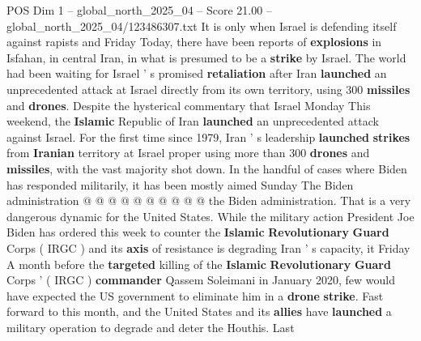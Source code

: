 \begin{textsample}{POS Dim 1 – global\_north\_2025\_04 – Score 21.00 – global\_north\_2025\_04/123486307.txt}
It is only when Israel is defending itself against rapists and Friday Today, there have been reports of \textbf{explosions} in Isfahan, in central Iran, in what is presumed to be a \textbf{strike} by Israel.
The world had been waiting for Israel ' s promised \textbf{retaliation} after Iran \textbf{launched} an unprecedented attack at Israel directly from its own territory, using 300 \textbf{missiles} and \textbf{drones}.
Despite the hysterical commentary that Israel Monday This weekend, the \textbf{Islamic} Republic of Iran \textbf{launched} an unprecedented attack against Israel.
For the first time since 1979, Iran ' s leadership \textbf{launched} \textbf{strikes} from \textbf{Iranian} territory at Israel proper using more than 300 \textbf{drones} and \textbf{missiles}, with the vast majority shot down.
In the handful of cases where Biden has responded militarily, it has been mostly aimed Sunday The Biden administration @ @ @ @ @ @ @ @ @ @ the Biden administration.
That is a very dangerous dynamic for the United States.
While the military action President Joe Biden has ordered this week to counter the \textbf{Islamic} \textbf{Revolutionary} \textbf{Guard} Corps ( IRGC ) and its \textbf{axis} of resistance is degrading Iran ' s capacity, it Friday A month before the \textbf{targeted} killing of the \textbf{Islamic} \textbf{Revolutionary} \textbf{Guard} Corps ' ( IRGC ) \textbf{commander} Qassem Soleimani in January 2020, few would have expected the US government to eliminate him in a \textbf{drone} \textbf{strike}.
Fast forward to this month, and the United States and its \textbf{allies} have \textbf{launched} a military operation to degrade and deter the Houthis.
Last

\end{textsample}
